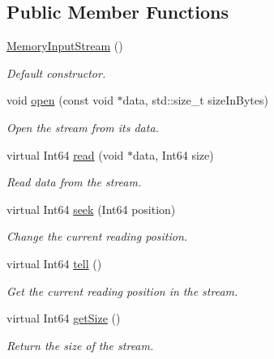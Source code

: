 \subsection*{Public Member Functions}
\begin{DoxyCompactItemize}
\item 
\mbox{\label{classsf_1_1_memory_input_stream_a2d78851a69a8956a79872be41bcdfe0e}} 
\hyperlink{classsf_1_1_memory_input_stream_a2d78851a69a8956a79872be41bcdfe0e}{Memory\+Input\+Stream} ()
\begin{DoxyCompactList}\small\item\em Default constructor. \end{DoxyCompactList}\item 
void \hyperlink{classsf_1_1_memory_input_stream_ad3cfb4f4f915f7803d6a0784e394ac19}{open} (const void $\ast$data, std\+::size\+\_\+t size\+In\+Bytes)
\begin{DoxyCompactList}\small\item\em Open the stream from its data. \end{DoxyCompactList}\item 
virtual Int64 \hyperlink{classsf_1_1_memory_input_stream_adff5270c521819639154d42d76fd4c34}{read} (void $\ast$data, Int64 size)
\begin{DoxyCompactList}\small\item\em Read data from the stream. \end{DoxyCompactList}\item 
virtual Int64 \hyperlink{classsf_1_1_memory_input_stream_aa2ac8fda2bdb4c95248ae90c71633034}{seek} (Int64 position)
\begin{DoxyCompactList}\small\item\em Change the current reading position. \end{DoxyCompactList}\item 
virtual Int64 \hyperlink{classsf_1_1_memory_input_stream_a7ad4bdf721f29de8f66421ff29e23ee4}{tell} ()
\begin{DoxyCompactList}\small\item\em Get the current reading position in the stream. \end{DoxyCompactList}\item 
virtual Int64 \hyperlink{classsf_1_1_memory_input_stream_a6ade3ca45de361ffa0a718595f0b6763}{get\+Size} ()
\begin{DoxyCompactList}\small\item\em Return the size of the stream. \end{DoxyCompactList}\end{DoxyCompactItemize}


